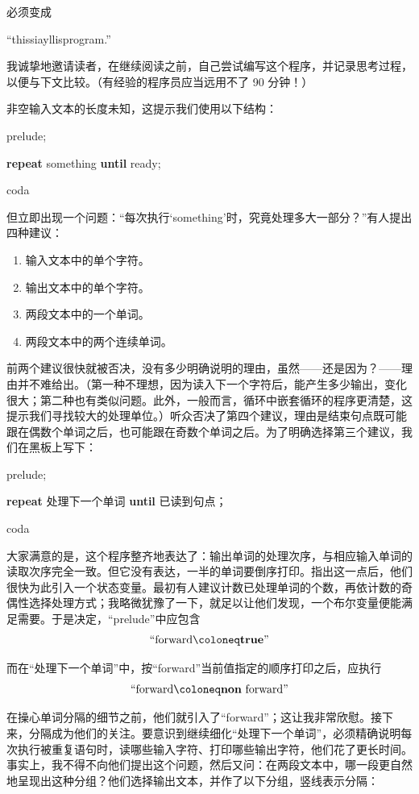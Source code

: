 \noindent
必须变成

\quad ``this\textendash si\textendash a\textendash yllis\textendash program.''

我诚挚地邀请读者，在继续阅读之前，自己尝试编写这个程序，并记录思考过程，以便与下文比较。（有经验的程序员应当远用不了 90 分钟！）

非空输入文本的长度未知，这提示我们使用以下结构：

\quad prelude;

\quad \textbf{repeat} something \textbf{until} ready;

\quad coda

\noindent
但立即出现一个问题：“每次执行‘something’时，究竟处理多大一部分？”有人提出四种建议：

\begin{enumerate}[wide, nosep, label=(\arabic*)]
	\item 输入文本中的单个字符。
	\item 输出文本中的单个字符。
	\item 两段文本中的一个单词。
	\item 两段文本中的两个连续单词。
\end{enumerate}

前两个建议很快就被否决，没有多少明确说明的理由，虽然——还是因为？——理由并不难给出。（第一种不理想，因为读入下一个字符后，能产生多少输出，变化很大；第二种也有类似问题。此外，一般而言，循环中嵌套循环的程序更清楚，这提示我们寻找较大的处理单位。）听众否决了第四个建议，理由是结束句点既可能跟在偶数个单词之后，也可能跟在奇数个单词之后。为了明确选择第三个建议，我们在黑板上写下：

\quad prelude;

\quad \textbf{repeat} 处理下一个单词 \textbf{until} 已读到句点；

\quad coda

大家满意的是，这个程序整齐地表达了：输出单词的处理次序，与相应输入单词的读取次序完全一致。但它没有表达，一半的单词要倒序打印。指出这一点后，他们很快为此引入一个状态变量。最初有人建议计数已处理单词的个数，再依计数的奇偶性选择处理方式；我略微犹豫了一下，就足以让他们发现，一个布尔变量便能满足需要。于是决定，“prelude”中应包含
$$
\text{``forward} \coloneq \text{\textbf{true}''}
$$

\noindent
而在“处理下一个单词”中，按“forward”当前值指定的顺序打印之后，应执行
$$
\text{``forward} \coloneq \text{\textbf{non} forward''}
$$

在操心单词分隔的细节之前，他们就引入了“forward”；这让我非常欣慰。接下来，分隔成为他们的关注。要意识到继续细化“处理下一个单词”，必须精确说明每次执行被重复语句时，读哪些输入字符、打印哪些输出字符，他们花了更长时间。事实上，我不得不向他们提出这个问题，然后又问：在两段文本中，哪一段更自然地呈现出这种分组？他们选择输出文本，并作了以下分组，竖线表示分隔：

